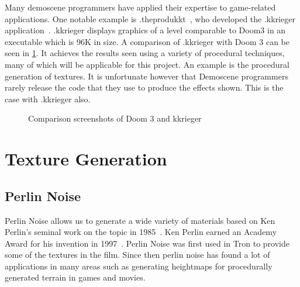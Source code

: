 Many demoscene programmers have applied their expertise to game-related applications.
One notable example is .theprodukkt~\cite{web:theprodukkt}, who developed the .kkrieger application~\cite{web:kkrieger}.
.kkrieger displays graphics of a level comparable to Doom3 in an executable which is 96K in size.
A comparison of .kkrieger with Doom 3 can be seen in \ref{fig:kkriegerdoomcomp}.
It achieves the results seen using a variety of procedural techniques, many of which will be applicable for this project.
An example is the procedural generation of textures.
It is unfortunate however that Demoscene programmers rarely release the code that they use to produce the effects shown.
This is the case with .kkrieger also.

\begin{figure}
  \centering
  \caption{Comparison screenshots of Doom 3 and kkrieger}
  \label{fig:kkriegerdoomcomp}
\end{figure}

\section{Texture Generation}

\subsection{Perlin Noise}
\label{sec:perlinnoise}
Perlin Noise allows us to generate a wide variety of materials based on Ken Perlin's seminal work on the topic in 1985~\cite{Perlin:1985:IS:325165.325247}.
Ken Perlin earned an Academy Award for his invention in 1997~\cite{web:perlinacademy}.
Perlin Noise was first used in Tron to provide some of the textures in the film.
Since then perlin noise has found a lot of applications in many areas such as generating heightmaps for procedurally generated terrain in games and movies.


